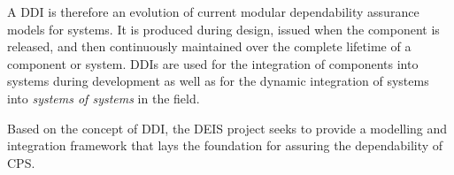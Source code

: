 A DDI is therefore an evolution of current modular dependability assurance models for systems. It is produced during design, issued when the component is released, and then continuously maintained over the complete lifetime of a component or system. DDIs are used for the integration of components into systems during development as well as for the dynamic integration of systems into \emph{systems of systems} in the field. 

Based on the concept of DDI, the DEIS project seeks to provide a modelling and integration framework that lays the foundation for assuring the dependability of CPS. 







